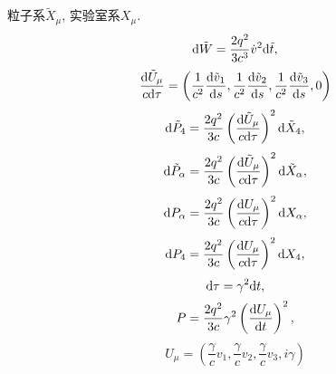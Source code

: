 粒子系$\tilde{X}_\mu$, 实验室系${X}_\mu$.
\begin{equation}
    \mathrm{d} \tilde{W}=\frac{2q^2}{3c^3}\dot{v}^2\mathrm{d} \tilde{t},
\end{equation}
\begin{equation}
    \frac{\mathrm{d} \tilde{U}_\mu}{c\mathrm{d} \tau}=\left(
        \frac{1}{c^2}\frac{\mathrm{d} \tilde{v}_1}{\mathrm{d} s},
        \frac{1}{c^2}\frac{\mathrm{d} \tilde{v}_2}{\mathrm{d} s},
        \frac{1}{c^2}\frac{\mathrm{d} \tilde{v}_3}{\mathrm{d} s},
        0
    \right)
\end{equation}
\begin{equation}
    \mathrm{d} \tilde{P}_4=\frac{2q^2}{3c}\left(\frac{\mathrm{d} \tilde{U}_\mu}{c\mathrm{d} \tau}\right)^2\mathrm{d} \tilde{X}_4,
\end{equation}
\begin{equation}
    \mathrm{d} \tilde{P}_\alpha=\frac{2q^2}{3c}\left(\frac{\mathrm{d} \tilde{U}_\mu}{c\mathrm{d} \tau}\right)^2\mathrm{d} \tilde{X}_\alpha,
\end{equation}
\begin{equation}
    \mathrm{d} {P}_\alpha=\frac{2q^2}{3c}\left(\frac{\mathrm{d} {U}_\mu}{c\mathrm{d} \tau}\right)^2\mathrm{d} {X}_\alpha,
\end{equation}
\begin{equation}
    \mathrm{d} {P}_4=\frac{2q^2}{3c}\left(\frac{\mathrm{d} {U}_\mu}{c\mathrm{d} \tau}\right)^2\mathrm{d} {X}_4,
\end{equation}
\begin{equation}
    \mathrm{d} \tau=\gamma^2\mathrm{d} t,
\end{equation}
\begin{equation}
    P=\frac{2q^2}{3c}\gamma^2\left(\frac{\mathrm{d} {U}_\mu}{\mathrm{d} t}\right)^2,
\end{equation}
\begin{equation}
    {U}_\mu=\left(
        \frac{\gamma}{c}v_1,
        \frac{\gamma}{c}v_2,
        \frac{\gamma}{c}v_3,
        i\gamma
    \right)
\end{equation}
